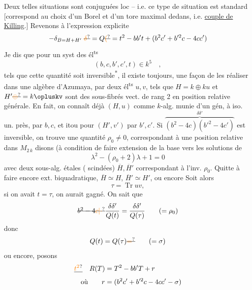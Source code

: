  Deux telles situations sont conjuguées loc -- i.e. ce type de situation est standard [correspond au choix d'un Borel et d'un tore maximal dedans, i.e. \uline{couple de Killing}.]
Revenons à l'expression explicite
\[
-\delta_{B=H+H'}\;\deleted{\unsure{\delta}}=Q\deleted{\unsure{(}}=t^2-bb't+(b^2c'+b'^2c-4cc')
\]
Je dis que pour un syst des él\textsuperscript{ts}
\[
(b,c,b',c',t)\in k^5\quad,
\]
tels que cette quantité soit inversible\textsuperscript{*},
 il existe toujours,  une façon de les
 réaliser dans une algèbre d'Azumaya, par deux él\textsuperscript{ts} $u,v$,  tels que $H=k\oplus ku$ et $H'\deleted{\unsure{\oplus}}=k\opluskv$ sont des sous-fibrés vect. de rang 2 en position relative générale. En fait, on connaît déjà $(H,u)$  comme $k$-alg. munie d'un gén, à iso. un. près, par $b,c$, et itou pour $(H',v')$ par $b',c'$. Si $\overbrace{(b^2-4c)(b'^2-4c')}^{\delta\delta'}$ est
 inversible, on trouve une quantité $\rho_0\ne0$, correspondant à  une position relative dans $M_{2\,k}$ disons (à condition de faire extension de la base vers les solutions de
\[
\lambda^2-(\rho_0+2)\lambda+1=0
\]
 avec deux sous-alg. étales ( scindées) $\overline H,\overline H'$ correspondant à l'inv. $\rho_0$. Quitte à faire encore ext. biquadratique,  $\overline H\simeq H$, $\overline H'\simeq H'$, ou encore   Soit alors
\[
\tau=\operatorname{Tr}uv,
\]
si on avait $t=\tau$, on aurait gagné. On sait que
\[
\deleted{b^2-4\unsure{c|\cdot}}\frac{\delta\delta'}{Q(t)}=\frac{\delta\delta'}{Q(\tau)}\qquad(=\rho_0)
\]
donc
\[
Q(t)=Q(\tau)\deleted{\unsure{=}}\qquad(=\sigma)
\]
 ou encore, posons 
\[
\begin{aligned}
\deleted{\unsure{t^2}}\quad R(T)&=T^2-bb'T+r\\ \text{où}\qquad r&=(b^2c'+b'^2c-4cc'-\sigma)
\end{aligned}
\]

